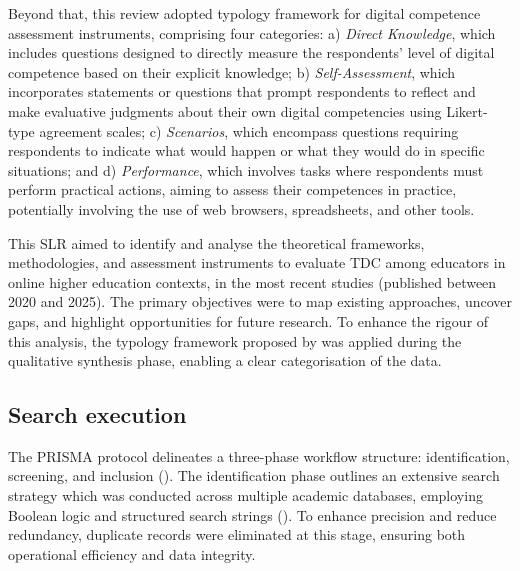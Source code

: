 \documentclass[english]{textolivre}
\begin{document}
Beyond that, this review adopted  typology framework for digital competence assessment instruments, comprising four categories: a) \textit{Direct Knowledge}, which includes questions designed to directly measure the respondents’ level of digital competence based on their explicit knowledge; b) \textit{Self-Assessment}, which incorporates statements or questions that prompt respondents to reflect and make evaluative judgments about their own digital competencies using Likert-type agreement scales; c) \textit{Scenarios}, which encompass questions requiring respondents to indicate what would happen or what they would do in specific situations; and d) \textit{Performance}, which involves tasks where respondents must perform practical actions, aiming to assess their competences in practice, potentially involving the use of web browsers, spreadsheets, and other tools.

This SLR aimed to identify and analyse the theoretical frameworks, methodologies, and assessment instruments to evaluate TDC among educators in online higher education contexts, in the most recent studies (published between 2020 and 2025). The primary objectives were to map existing approaches, uncover gaps, and highlight opportunities for future research. To enhance the rigour of this analysis, the typology framework proposed by \textcite{mattar2022digcomp} was applied during the qualitative synthesis phase, enabling a clear categorisation of the data.

\subsection{Search execution}\label{sec-organizacao-latex}
The PRISMA protocol delineates a three-phase workflow structure: identification, screening, and inclusion (). The identification phase outlines an extensive search strategy which was conducted across multiple academic databases, employing Boolean logic and structured search strings (). To enhance precision and reduce redundancy, duplicate records were eliminated at this stage, ensuring both operational efficiency and data integrity.
\end{document}
